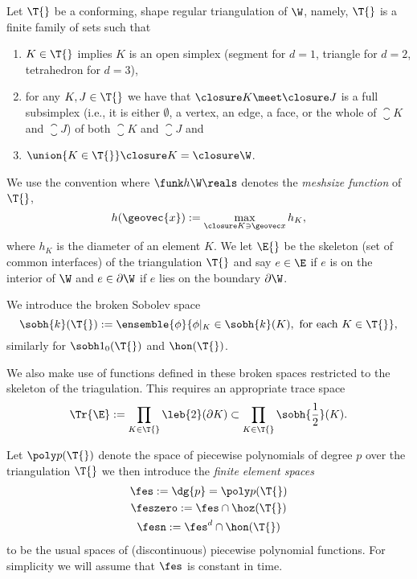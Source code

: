 \documentclass[final]{amsart}
\numberwithin{equation}{section}
\begin{document}
Let $\T{}$ be a conforming, shape regular triangulation of $\W$,
namely, $\T{}$ is a finite family of sets such that
\begin{enumerate}
\item $K\in\T{}$ implies $K$ is an open simplex (segment for $d=1$,
  triangle for $d=2$, tetrahedron for $d=3$),
\item for any $K,J\in\T{}$ we have that $\closure K\meet\closure J$ is
  a full subsimplex (i.e., it is either $\emptyset$, a vertex, an
  edge, a face, or the whole of $\closure K$ and $\closure J$) of both
  $\closure K$ and $\closure J$ and
\item $\union{K\in\T{}}\closure K=\closure\W$.
\end{enumerate}
We use the convention where $\funk h\W\reals$ denotes the
\emph{meshsize function} of $\T{}$, \ie 
\begin{equation}
  h(\geovec{x}):=\max_{\closure K\ni \geovec x}h_K,  
\end{equation}
where $h_K$ is the diameter of an element $K$. We let $\E{}$ be the
skeleton (set of common interfaces) of the triangulation $\T{}$ and
say $e\in\E$ if $e$ is on the interior of $\W$ and $e\in\partial\W$ if
$e$ lies on the boundary $\partial\W$.

\begin{Defn}
  \label{defn:broken-sobolev-space}
  
  We introduce the
  broken Sobolev space
  \begin{equation}
    \sobh{k}(\T{})
    :=
    \ensemble{\phi}
             {\phi|_K\in\sobh{k}(K), \text{ for each } K \in \T{}},
  \end{equation}
  similarly for $\sobh1_0(\T{})$ and $\hon(\T{})$.

  We also make use of functions defined in these broken spaces
  restricted to the skeleton of the triagulation. This requires an
  appropriate trace space
  \begin{equation}
    \Tr{\E}
    :=
    \prod_{K\in\T{}} \leb{2}(\partial K) 
    \subset
    \prod_{K\in\T{}} \sobh{\frac{1}{2}}(K).
  \end{equation}
\end{Defn}

Let $\poly p(\T{})$ denote the space of piecewise polynomials of
degree $p$ over the triangulation $\T{}$ we then introduce the
\emph{finite element spaces}
\begin{gather}
  \label{eqn:def:finite-element-space}
  \fes := \dg{p} = \poly p(\T{})
  \\
  \feszero := \fes \cap \hoz(\T{})
  \\
  \fesn := \fes^d \cap \hon(\T{})
\end{gather}
to be the usual spaces of (discontinuous) piecewise polynomial
functions. For simplicity we will assume that $\fes$ is constant in time.
\end{document}
